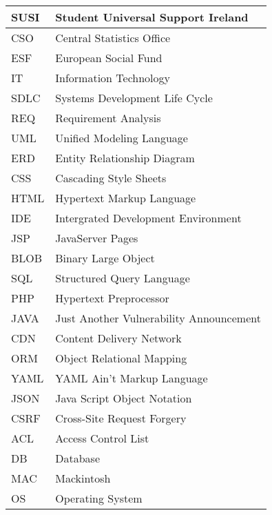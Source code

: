 



\begin{longtable}{p{90pt}l}
\hline SUSI	& Student Universal Support Ireland \\
\hline CSO	& Central Statistics Office \\
\hline ESF		& European Social Fund \\
\hline IT		& Information Technology \\
\hline SDLC      & Systems Development Life Cycle \\
\hline REQ	& Requirement Analysis \\
\hline UML	& Unified Modeling Language \\
\hline ERD	& Entity Relationship Diagram \\
\hline CSS	& Cascading Style Sheets \\
\hline HTML      & Hypertext Markup Language \\
\hline IDE		& Intergrated Development Environment \\
\hline JSP		& JavaServer Pages \\
\hline BLOB	& Binary Large Object \\
\hline SQL		& Structured Query Language \\
\hline PHP      	& Hypertext Preprocessor \\
\hline JAVA     	& Just Another Vulnerability Announcement \\
\hline CDN      	& Content Delivery Network \\
\hline ORM      	& Object Relational Mapping \\
\hline YAML      	& YAML Ain't Markup Language \\
\hline JSON      	& Java Script Object Notation \\
\hline CSRF    	& Cross-Site Request Forgery \\
\hline ACL    	& Access Control List \\
\hline DB    	& Database \\
\hline MAC    	& Mackintosh \\
\hline OS    	& Operating System \\
\hline
\end{longtable}






